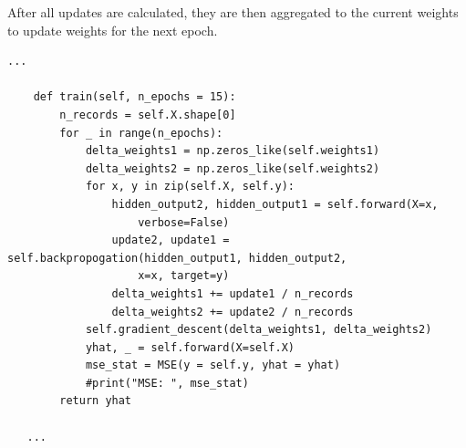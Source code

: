 \documentclass[12pt]{article}%
\begin{document}
After all updates are calculated, they are then aggregated to the current weights to update weights for the next epoch.

\begin{lstlisting}
...
	
    def train(self, n_epochs = 15):
        n_records = self.X.shape[0]
        for _ in range(n_epochs):
            delta_weights1 = np.zeros_like(self.weights1)
            delta_weights2 = np.zeros_like(self.weights2)
            for x, y in zip(self.X, self.y):
                hidden_output2, hidden_output1 = self.forward(X=x,
                    verbose=False)
                update2, update1 = self.backpropogation(hidden_output1, hidden_output2, 
                    x=x, target=y)
                delta_weights1 += update1 / n_records
                delta_weights2 += update2 / n_records
            self.gradient_descent(delta_weights1, delta_weights2)
            yhat, _ = self.forward(X=self.X)
            mse_stat = MSE(y = self.y, yhat = yhat)
            #print("MSE: ", mse_stat)
        return yhat
   
   ...         
\end{lstlisting}
\end{document}
